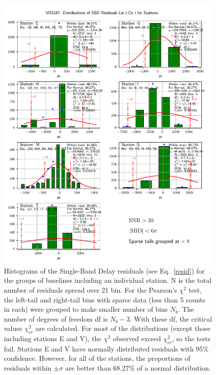 \documentclass[letterpaper,twoside,12pt]{article}
\begin{document}
\begin{figure}[ht!]
  \begin{center}
  \includegraphics[width=33pc]{VO2187_Distr_SBD_Lin_I-Cir_I_Diff_Stations.pdf}
  \caption{\small Histograms of the Single-Band Delay residuals (see Eq.~\eqref{resid}) for the groups of baselines including an individual station. N is the total number of residuals spread over 21 bin. For the Pearson's $\chi^2$ test, the left-tail and right-tail bins with sparse data (less than 5 counts in each) were grouped to make smaller number of bins $N_b$. The number of degrees of freedom df is $N_b-3$. With these df, the critical values $\chi^2_{cr}$ are calculated. For most of the distributions (except those including stations E and V), the $\chi^2$ observed exceed $\chi^2_{cr}$, so the tests fail. Stations E and V have normally distributed residuals with 95\% confidence. However, for all of the stations, the proportions of residuals within $\pm\sigma$ are better than 68.27\% of a normal distribution.}
  \label{dsbd_distr_st}
  \end{center}
\end{figure}
\end{document}

